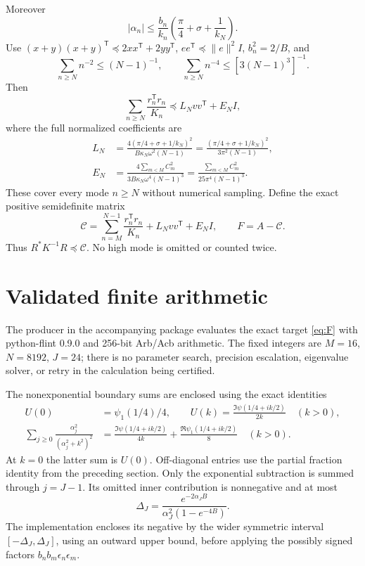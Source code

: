 \documentclass[11pt]{article}
\newcommand{\norm}[1]{\lVert#1\rVert}
\begin{document}
Moreover
\[
 |\alpha_n|\le\frac{b_n}{k_n}\left(\frac\pi4+\sigma+\frac1{k_N}\right).
\]
Use $(x+y)(x+y)^{\mathsf T}\preceq2xx^{\mathsf T}+2yy^{\mathsf T}$, $ee^{\mathsf T}\preceq\norm e^2I$, $b_n^2=2/B$, and
\[
 \sum_{n\ge N}n^{-2}\le(N-1)^{-1},\qquad
 \sum_{n\ge N}n^{-4}\le[3(N-1)^3]^{-1}.
\]
Then
\begin{equation}
 \sum_{n\ge N}\frac{r_n^{\mathsf T}r_n}{K_n}
 \preceq L_Nvv^{\mathsf T}+E_NI,\label{eq:tail}
\end{equation}
where the full normalized coefficients are
\begin{align}
 L_N&=\frac{4(\pi/4+\sigma+1/k_N)^2}{B\kappa_N\omega^2(N-1)}
      =\frac{(\pi/4+\sigma+1/k_N)^2}{3\pi^2(N-1)},\nonumber\\
 E_N&=\frac{4\sum_{m<M}C_m^2}{3B\kappa_N\omega^4(N-1)^3}
      =\frac{\sum_{m<M}C_m^2}{25\pi^4(N-1)^3}.\label{eq:LE}
\end{align}
These cover every mode $n\ge N$ without numerical sampling. Define the exact positive semidefinite matrix
\begin{equation}
 \mathcal C=\sum_{n=M}^{N-1}\frac{r_n^{\mathsf T}r_n}{K_n}
           +L_Nvv^{\mathsf T}+E_NI,\qquad F=A-\mathcal C.\label{eq:F}
\end{equation}
Thus $R^*K^{-1}R\preceq\mathcal C$. No high mode is omitted or counted twice.

\section{Validated finite arithmetic}\label{sec:certificate}
The producer in the accompanying package evaluates the exact target \eqref{eq:F} with python-flint 0.9.0 and 256-bit Arb/Acb arithmetic. The fixed integers are $M=16$, $N=8192$, $J=24$; there is no parameter search, precision escalation, eigenvalue solver, or retry in the calculation being certified.

The nonexponential boundary sums are enclosed using the exact identities
\begin{align}
 U(0)&=\psi_1(1/4)/4,\qquad
 U(k)=\frac{\Im\psi(1/4+ik/2)}{2k}\quad(k>0),\nonumber\\
 \sum_{j\ge0}\frac{\alpha_j^2}{(\alpha_j^2+k^2)^2}
 &=\frac{\Im\psi(1/4+ik/2)}{4k}
   +\frac{\Re\psi_1(1/4+ik/2)}8\quad(k>0).
\end{align}
At $k=0$ the latter sum is $U(0)$. Off-diagonal entries use the partial fraction identity from the preceding section. Only the exponential subtraction is summed through $j=J-1$. Its omitted inner contribution is nonnegative and at most
\[
 \Delta_J=\frac{e^{-2\alpha_JB}}{\alpha_J^2(1-e^{-4B})}.
\]
The implementation encloses its negative by the wider symmetric interval $[-\Delta_J,\Delta_J]$, using an outward upper bound, before applying the possibly signed factors $b_nb_m\epsilon_n\epsilon_m$.
\end{document}
